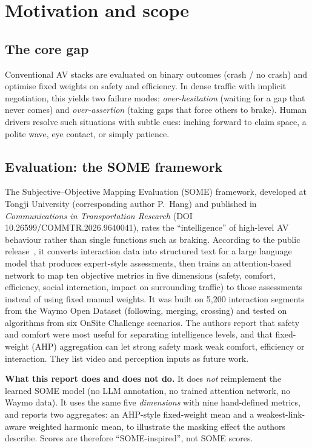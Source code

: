 \documentclass[11pt,a4paper]{article}
\begin{document}
\section{Motivation and scope}
\subsection*{The core gap}
Conventional AV stacks are evaluated on binary outcomes (crash / no crash) and optimise fixed weights on safety and efficiency. In dense traffic with implicit negotiation, this yields two failure modes: \emph{over-hesitation} (waiting for a gap that never comes) and \emph{over-assertion} (taking gaps that force others to brake). Human drivers resolve such situations with subtle cues: inching forward to claim space, a polite wave, eye contact, or simply patience.

\subsection*{Evaluation: the SOME framework}
The Subjective--Objective Mapping Evaluation (SOME) framework, developed at Tongji University (corresponding author P.~Hang) and published in \emph{Communications in Transportation Research} (DOI 10.26599/COMMTR.2026.9640041), rates the ``intelligence'' of high-level AV behaviour rather than single functions such as braking. According to the public release~\cite{some}, it converts interaction data into structured text for a large language model that produces expert-style assessments, then trains an attention-based network to map ten objective metrics in five dimensions (safety, comfort, efficiency, social interaction, impact on surrounding traffic) to those assessments instead of using fixed manual weights. It was built on 5{,}200 interaction segments from the Waymo Open Dataset (following, merging, crossing) and tested on algorithms from six OnSite Challenge scenarios. The authors report that safety and comfort were most useful for separating intelligence levels, and that fixed-weight (AHP) aggregation can let strong safety mask weak comfort, efficiency or interaction. They list video and perception inputs as future work.

\textbf{What this report does and does not do.} It does \emph{not} reimplement the learned SOME model (no LLM annotation, no trained attention network, no Waymo data). It uses the same five \emph{dimensions} with nine hand-defined metrics, and reports two aggregates: an AHP-style fixed-weight mean and a weakest-link-aware weighted harmonic mean, to illustrate the masking effect the authors describe. Scores are therefore ``SOME-inspired'', not SOME scores.
\end{document}
